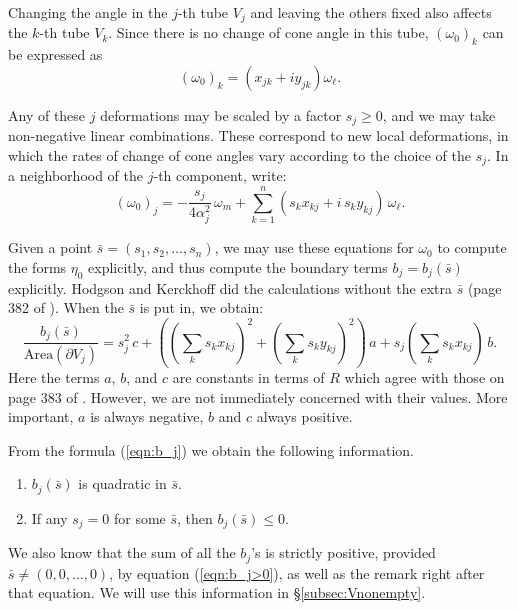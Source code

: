 Changing the angle in the $j$-th tube $V_j$ and leaving the others
fixed also affects the $k$-th tube $V_k$.  Since there is no change of
cone angle in this tube, $(\omega_0)_k$ can be expressed as
\begin{equation*}
  (\omega_0)_k = (x_{jk}+iy_{jk})\omega_\ell.
\end{equation*}

Any of these $j$ deformations may be scaled by a factor $s_j\geq 0$,
and we may take non-negative linear combinations.  These correspond to
new local deformations, in which the rates of change of cone angles
vary according to the choice of the $s_j$.  In a neighborhood of the
$j$-th component, write:
\begin{equation}
(\omega_0)_j = -\frac{s_j}{4\alpha_j^2}\,\omega_m + \sum_{k=1}^n (s_k
x_{kj} + i\,s_k y_{kj})\,\omega_\ell.
\label{eqn:omega_0-S}
\end{equation}

Given a point $\bar{s} = (s_1, s_2, \dots, s_n)$, we may use these
equations for $\omega_0$ to compute the forms $\eta_0$ explicitly, and
thus compute the boundary terms $b_j = b_j(\bar{s})$ explicitly.
Hodgson and Kerckhoff did the calculations without the extra $\bar{s}$
(page 382 of \cite{hk:univ}).  When the $\bar{s}$ is put in, we
obtain:
\begin{equation}
\frac{b_j(\bar{s})}{\mbox{Area}(\partial V_j)}= s_j^2\,c +
\left( (\sum_k s_k x_{kj})^2 + 
   (\sum_k s_k y_{kj})^2 \right)\,a +
  s_j(\sum_k s_k x_{kj}) \,b.
\label{eqn:b_j}
\end{equation}
Here the terms $a$, $b$, and $c$ are constants in terms of $R$ which
agree with those on page 383 of \cite{hk:univ}.  However, we are not
immediately concerned with their values.  More important, $a$ is
always negative, $b$ and $c$ always positive.

From the formula (\ref{eqn:b_j}) we obtain the following information.
\begin{enumerate}
  \item $b_j(\bar{s})$ is quadratic in $\bar{s}$.
  \item If any $s_j=0$ for some $\bar{s}$, then $b_j(\bar{s})\leq 0$.
\end{enumerate}

We also know that the sum of all the $b_j$'s is strictly positive,
provided $\bar{s} \neq (0, 0, \dots, 0)$, by equation
(\ref{eqn:b_j>0}), as well as the remark right after that equation.
We will use this information in \S\ref{subsec:Vnonempty}.

